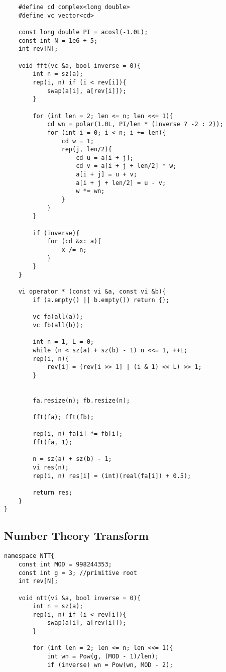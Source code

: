 \documentclass[11pt,a4paper]{article}
\begin{document}
\begin{multicols*}{2}
\begin{lstlisting}
    #define cd complex<long double>
    #define vc vector<cd>

    const long double PI = acosl(-1.0L);
    const int N = 1e6 + 5;
    int rev[N];

    void fft(vc &a, bool inverse = 0){
        int n = sz(a);
        rep(i, n) if (i < rev[i]){
            swap(a[i], a[rev[i]]);
        }

        for (int len = 2; len <= n; len <<= 1){
            cd wn = polar(1.0L, PI/len * (inverse ? -2 : 2));
            for (int i = 0; i < n; i += len){
                cd w = 1;
                rep(j, len/2){
                    cd u = a[i + j];
                    cd v = a[i + j + len/2] * w;
                    a[i + j] = u + v;
                    a[i + j + len/2] = u - v;
                    w *= wn;
                }
            }
        }

        if (inverse){
            for (cd &x: a){
                x /= n;
            }
        }
    }

    vi operator * (const vi &a, const vi &b){
        if (a.empty() || b.empty()) return {};

        vc fa(all(a));
        vc fb(all(b));

        int n = 1, L = 0;
        while (n < sz(a) + sz(b) - 1) n <<= 1, ++L;
        rep(i, n){
            rev[i] = (rev[i >> 1] | (i & 1) << L) >> 1;
        }


        fa.resize(n); fb.resize(n);

        fft(fa); fft(fb);

        rep(i, n) fa[i] *= fb[i];
        fft(fa, 1);

        n = sz(a) + sz(b) - 1;
        vi res(n);
        rep(i, n) res[i] = (int)(real(fa[i]) + 0.5);
        
        return res;
    }
}
\end{lstlisting}

\subsection{Number Theory Transform}
\begin{lstlisting}
namespace NTT{
    const int MOD = 998244353;
    const int g = 3; //primitive root
    int rev[N];

    void ntt(vi &a, bool inverse = 0){
        int n = sz(a);
        rep(i, n) if (i < rev[i]){
            swap(a[i], a[rev[i]]);
        }

        for (int len = 2; len <= n; len <<= 1){
            int wn = Pow(g, (MOD - 1)/len);
            if (inverse) wn = Pow(wn, MOD - 2);
            

\end{lstlisting}
\end{multicols*}
\end{document}
